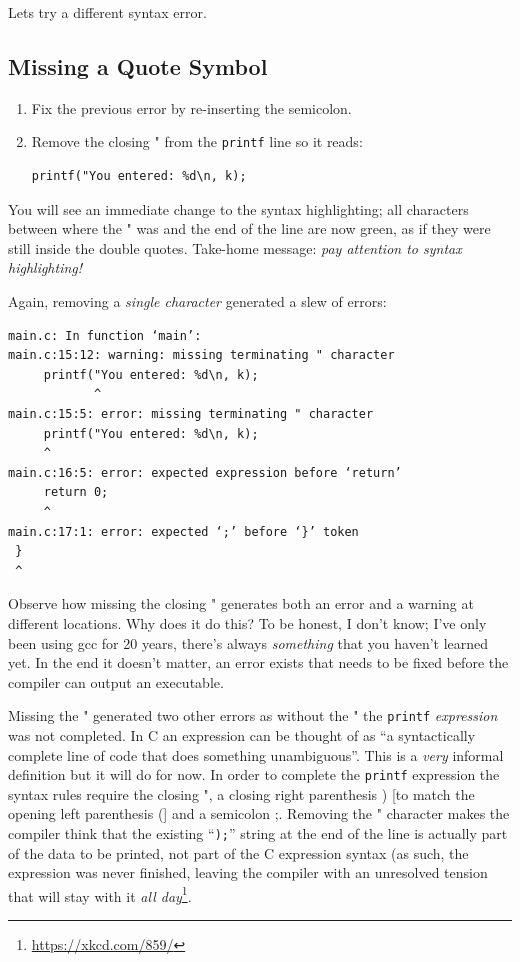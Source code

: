 \documentclass{lab}
\begin{document}
Lets try a different syntax error.

\subsection{Missing a Quote Symbol}

\begin{task}{}{}
\begin{enumerate}
\item Fix the previous error by re-inserting the semicolon.
\item Remove the closing " from the \texttt{printf} line so it reads:
\begin{lstlisting}[style=CStyle]
printf("You entered: %d\n, k);
\end{lstlisting}
\end{enumerate}
\end{task}

You will see an immediate change to the syntax highlighting; all characters between where the " was and the end of the line are now green, as if they were still inside the double quotes. Take-home message: \textit{pay attention to syntax highlighting!}

Again, removing a \textit{single character} generated a slew of errors:

\begin{lstlisting}[basicstyle=\ttfamily,caption=Errors produced by removing a \texttt{"} character.,frame=single]
main.c: In function ‘main’:
main.c:15:12: warning: missing terminating " character
     printf("You entered: %d\n, k);
            ^
main.c:15:5: error: missing terminating " character
     printf("You entered: %d\n, k);
     ^
main.c:16:5: error: expected expression before ‘return’
     return 0;
     ^
main.c:17:1: error: expected ‘;’ before ‘}’ token
 }
 ^
\end{lstlisting}

Observe how missing the closing " generates both an error and a warning at different locations. Why does it do this? To be honest, I don't know; I've only been using gcc for 20 years, there's always \textit{something} that you haven't learned yet. In the end it doesn't matter, an error exists that needs to be fixed before the compiler can output an executable.

Missing the " generated two other errors as without the " the \texttt{printf} \textit{expression} was not completed. In C an expression can be thought of as ``a syntactically complete line of code that does something unambiguous''. This is a \textit{very} informal definition but it will do for now. In order to complete the \texttt{printf} expression the syntax rules require the closing ", a closing right parenthesis ) [to match the opening left parenthesis (] and a semicolon ;. Removing the " character makes the compiler think that the existing ``\texttt{);}'' string at the end of the line is actually part of the data to be printed, not part of the C expression syntax (as such, the expression was never finished, leaving the compiler with an unresolved tension that will stay with it \textit{all day}\footnote{\url{https://xkcd.com/859/}}.
\end{document}
